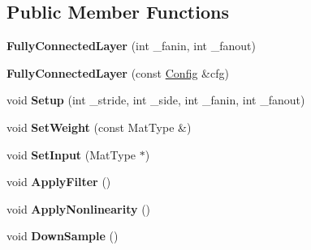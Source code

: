 \subsection*{Public Member Functions}
\begin{DoxyCompactItemize}
\item 
\hypertarget{class_fully_connected_layer_a4bceb4e39fe4e7a716ce50210de3a988}{{\bfseries Fully\+Connected\+Layer} (int \+\_\+fanin, int \+\_\+fanout)}\label{class_fully_connected_layer_a4bceb4e39fe4e7a716ce50210de3a988}

\item 
\hypertarget{class_fully_connected_layer_a76e1fc371040de4e52cbe23c99901840}{{\bfseries Fully\+Connected\+Layer} (const \hyperlink{struct_config}{Config} \&cfg)}\label{class_fully_connected_layer_a76e1fc371040de4e52cbe23c99901840}

\item 
\hypertarget{class_fully_connected_layer_adba270546f0865b3adfb2739fcd7818e}{void {\bfseries Setup} (int \+\_\+stride, int \+\_\+side, int \+\_\+fanin, int \+\_\+fanout)}\label{class_fully_connected_layer_adba270546f0865b3adfb2739fcd7818e}

\item 
\hypertarget{class_fully_connected_layer_a13326e661fb3459d05653972d8ed0e5c}{void {\bfseries Set\+Weight} (const Mat\+Type \&)}\label{class_fully_connected_layer_a13326e661fb3459d05653972d8ed0e5c}

\item 
\hypertarget{class_fully_connected_layer_abc76d6caa38d466a2b58d824e50a9eb2}{void {\bfseries Set\+Input} (Mat\+Type $\ast$)}\label{class_fully_connected_layer_abc76d6caa38d466a2b58d824e50a9eb2}

\item 
\hypertarget{class_fully_connected_layer_a71b13c03aed1aa3b97920279e3534f7b}{void {\bfseries Apply\+Filter} ()}\label{class_fully_connected_layer_a71b13c03aed1aa3b97920279e3534f7b}

\item 
\hypertarget{class_fully_connected_layer_aeaa164864cf41ae5fe116cf8533a1817}{void {\bfseries Apply\+Nonlinearity} ()}\label{class_fully_connected_layer_aeaa164864cf41ae5fe116cf8533a1817}

\item 
\hypertarget{class_fully_connected_layer_ae769cfe87e16198f8b0959f87bfb3100}{void {\bfseries Down\+Sample} ()}\label{class_fully_connected_layer_ae769cfe87e16198f8b0959f87bfb3100}

\end{DoxyCompactItemize}
